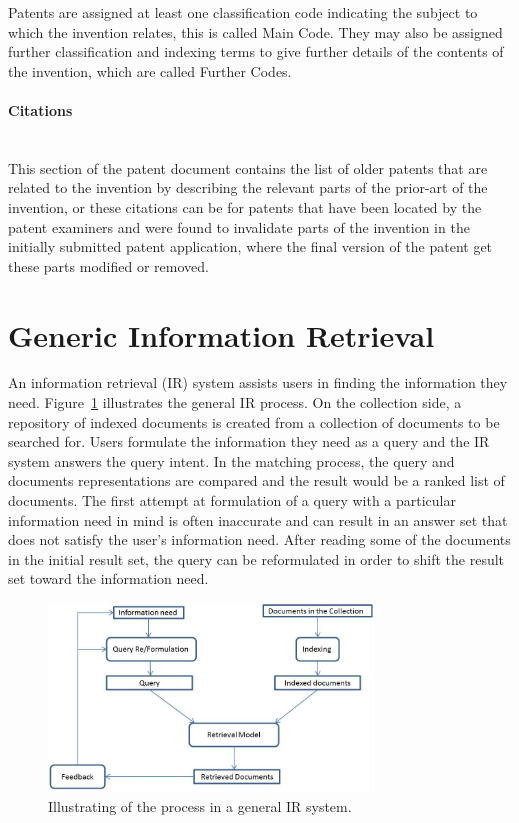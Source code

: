 Patents are assigned at least one classification code 
indicating the subject to which the invention relates, this is called Main Code. They may also be assigned further classification and 
indexing terms to give further details of the contents of the invention, which are called Further Codes. 

\paragraph{Citations}
\ \\ 
This section of the patent document contains the list of older patents that are related to the
invention by describing the relevant parts of the prior-art of the invention, or these citations can
be for patents that have been located by the patent examiners and were found to invalidate parts 
of the invention in the initially submitted patent application, where the final version of the patent
get these parts modified or removed.
\section{Generic Information Retrieval}
An information retrieval (IR) system assists users in finding the information they need. Figure~\ref{fig:generalir} illustrates the general IR process. On the collection side, a repository of indexed documents is created from a collection of documents to be searched for. Users formulate the information they need as a query and the IR system answers the query intent. In the matching process, the query and documents representations are compared and the result would be a ranked list of documents. The first attempt at formulation of a query with a particular information need in mind
is often inaccurate and can result in an answer set that does not satisfy the user's information need. 
After reading some of the documents in the initial result set, the query can be reformulated in order to shift the result set toward the information need.
\begin{figure}[htpb]
   \centering
   \includegraphics[width=.60\textwidth,height=50mm]{figs/generalIR.jpg}
   \caption{Illustrating of the process in a general IR system.}  
   \label{fig:generalir} 
\end{figure}
\FloatBarrier 
